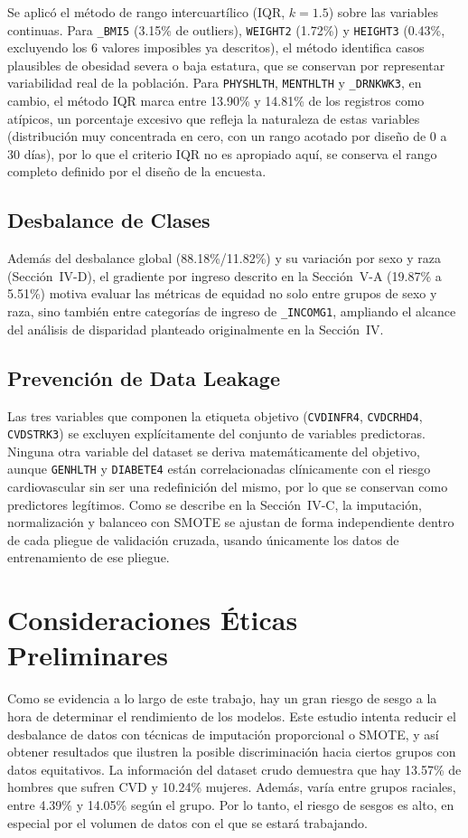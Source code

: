 \documentclass[conference]{IEEEtran}
\begin{document}
Se aplicó el método de rango intercuartílico (IQR, $k=1.5$) sobre las variables continuas. Para \texttt{\_BMI5} (3.15\% de outliers), \texttt{WEIGHT2} (1.72\%) y \texttt{HEIGHT3} (0.43\%, excluyendo los 6 valores imposibles ya descritos), el método identifica casos plausibles de obesidad severa o baja estatura, que se conservan por representar variabilidad real de la población. Para \texttt{PHYSHLTH}, \texttt{MENTHLTH} y \texttt{\_DRNKWK3}, en cambio, el método IQR marca entre 13.90\% y 14.81\% de los registros como atípicos, un porcentaje excesivo que refleja la naturaleza de estas variables (distribución muy concentrada en cero, con un rango acotado por diseño de 0 a 30 días), por lo que el criterio IQR no es apropiado aquí, se conserva el rango completo definido por el diseño de la encuesta.

\subsection{Desbalance de Clases}

Además del desbalance global (88.18\%/11.82\%) y su variación por sexo y raza (Sección~IV-D), el gradiente por ingreso descrito en la Sección~V-A (19.87\% a 5.51\%) motiva evaluar las métricas de equidad no solo entre grupos de sexo y raza, sino también entre categorías de ingreso de \texttt{\_INCOMG1}, ampliando el alcance del análisis de disparidad planteado originalmente en la Sección~IV.

\subsection{Prevención de Data Leakage}

Las tres variables que componen la etiqueta objetivo (\texttt{CVDINFR4}, \texttt{CVDCRHD4}, \texttt{CVDSTRK3}) se excluyen explícitamente del conjunto de variables predictoras. Ninguna otra variable del dataset se deriva matemáticamente del objetivo, aunque \texttt{GENHLTH} y \texttt{DIABETE4} están correlacionadas clínicamente con el riesgo cardiovascular sin ser una redefinición del mismo, por lo que se conservan como predictores legítimos. Como se describe en la Sección~IV-C, la imputación, normalización y balanceo con SMOTE se ajustan de forma independiente dentro de cada pliegue de validación cruzada, usando únicamente los datos de entrenamiento de ese pliegue.

\section{Consideraciones Éticas Preliminares}
Como se evidencia a lo largo de este trabajo, hay un gran riesgo de sesgo a la hora de determinar el rendimiento de los modelos. Este estudio intenta reducir el desbalance de datos con técnicas de imputación proporcional o SMOTE,  y así obtener resultados que ilustren la posible discriminación hacia ciertos grupos con datos equitativos. La información del dataset crudo demuestra que hay 13.57\% de hombres que sufren CVD y 10.24\% mujeres. Además, varía entre grupos raciales, entre 4.39\% y 14.05\% según el grupo. Por lo tanto, el riesgo de sesgos es alto, en especial por el volumen de datos con el que se estará trabajando.
\end{document}
